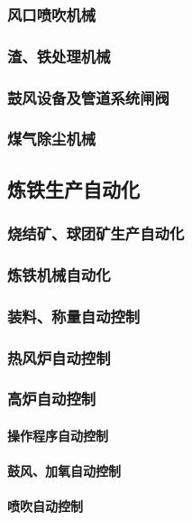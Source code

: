 \documentclass[UTF8]{../../ApplicationUniverse}
\begin{document}
        \subsubsection{风口喷吹机械}
        \subsubsection{渣、铁处理机械}
        \subsubsection{鼓风设备及管道系统闸阀}
        \subsubsection{煤气除尘机械}
    \subsection{炼铁生产自动化}
        \subsubsection{烧结矿、球团矿生产自动化}
        \subsubsection{炼铁机械自动化}
        \subsubsection{装料、称量自动控制}
        \subsubsection{热风炉自动控制}
        \subsubsection{高炉自动控制}
            \paragraph{操作程序自动控制}
            \paragraph{鼓风、加氧自动控制}
            \paragraph{喷吹自动控制}
\end{document}
